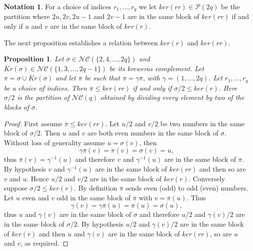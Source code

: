 \documentclass{article}
\newtheorem{proposition}[theorem]{Proposition}
\theoremstyle{definition}
\newtheorem{notation}   [theorem]{Notation}
\newcommand{\cP}{\mathcal{P}}
\newcommand{\NC}{\mathcal{NC}}
\begin{document}
{\begin{notation}\label{Notation: Ker rr}
For a choice of indices $r_1,\dots,r_q$ we let $ker(rr)\in \cP(2q)$ be the partition where $2u,2v,2u-1$ and $2v-1$ are in the same block of $ker(rr)$ if and only if $u$ and $v$ are in the same block of $ker(r)$.
\end{notation}

The next proposition establishes a relation between $ker(r)$ and $ker(rr)$.

\begin{proposition}\label{Proposition: Equivalence of ker(r) and Ker(rr)}
Let $\sigma\in \NC(\{2,4,\dots,2q\})$ and $Kr(\sigma)\in \NC(\{1,3,\dots,2q-1\})$ be its kreweras complement. Let $\pi=\sigma\cup Kr(\sigma)$ and let $\overline{\pi}$ be such that $\pi=\gamma\overline{\pi}$, with $\gamma=(1,\dots,2q)$. Let $r_1,\dots,r_q$ be a choice of indices. Then $\overline{\pi}\leq ker(rr)$ if and only if $\sigma/2 \leq ker(r)$. Here $\sigma/2$ is the partition of $\NC(q)$ obtained by dividing every element by two of the blocks of $\sigma$.
\end{proposition}
\begin{proof}
First assume $\overline{\pi}\leq ker(rr)$. Let $u/2$ and $v/2$ be two numbers in the same block of $\sigma/2$. Then $u$ and $v$ are both even numbers in the same block of $\sigma$. Without loss of generality assume $u=\sigma(v)$, then
$$\gamma\overline{\pi}(v)=\pi(v)=\sigma(v)=u,$$
thus $\overline{\pi}(v)=\gamma^{-1}(u)$ and therefore $v$ and $\gamma^{-1}(u)$ are in the same block of $\overline{\pi}$. By hypothesis $v$ and $\gamma^{-1}(u)$ are in the same block of $ker(rr)$ and then so are $v$ and $u$. Hence $u/2$ and $v/2$ are in the same block of $ker(r)$. Conversely suppose $\sigma/2 \leq ker(r)$. By definition $\overline{\pi}$ sends even (odd) to odd (even) numbers. Let $u$ even and $v$ odd in the same block of $\overline{\pi}$ with $v=\overline{\pi}(u)$. Thus
$$\gamma(v)=\gamma\overline{\pi}(u)=\pi(u)=\sigma(u),$$
thus $u$ and $\gamma(v)$ are in the same block of $\sigma$ and therefore $u/2$ and $\gamma(v)/2$ are in the same block of $\sigma/2$. By hypothesis $u/2$ and $\gamma(v)/2$ are in the same block of $ker(r)$ and then $u$ and $\gamma(v)$ are in the same block of $ker(rr)$, so are $u$ and $v$, as required.
\end{proof}

}
\end{document}

